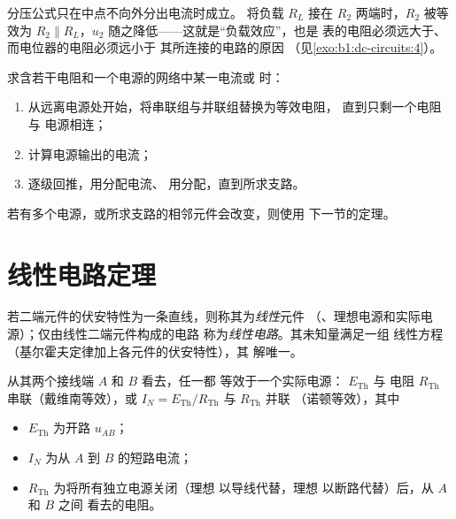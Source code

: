 \begin{remark}[分压器的负载]\label{rem:b1:dc-circuits:loading}
分压公式只在中点不向外分出电流时成立。
将负载 $R_L$ 接在 $R_2$ 两端时，$R_2$ 被等效为 $R_2
\parallel R_L$，$u_2$ 随之降低——这就是“负载效应”，也是
表的电阻必须远大于、而电位器的电阻必须远小于
其所连接的电路的原因
（见\cref{exo:b1:dc-circuits:4}）。
\end{remark}

\begin{method}[化简网络]\label{met:b1:dc-circuits:reduce}
求含若干电阻和一个电源的网络中某一电流或
时：
\begin{enumerate}
  \item 从远离电源处开始，将串联组与并联组替换为等效电阻，
        直到只剩一个电阻与
        电源相连；
  \item 计算电源输出的电流；
  \item 逐级回推，用分配电流、
        用分配，直到所求支路。
\end{enumerate}
若有多个电源，或所求支路的相邻元件会改变，则使用
下一节的定理。
\end{method}

\section{线性电路定理}

\begin{definition}\label{def:b1:dc-circuits:linear}
若二端元件的伏安特性为一条直线，则称其为\emph{线性}元件
（、理想电源和实际电源）；仅由线性二端元件构成的电路
称为\emph{线性电路}。其未知量满足一组
线性方程（基尔霍夫定律加上各元件的伏安特性），其
解唯一。
\end{definition}

\begin{theorem}[戴维南定理与诺顿定理]\label{thm:b1:dc-circuits:thevenin}
从其两个接线端 $A$ 和 $B$ 看去，任一都
等效于一个实际电源： $E_{\mathrm{Th}}$ 与
电阻 $R_{\mathrm{Th}}$ 串联（戴维南等效），或 $I_N =
E_{\mathrm{Th}}/R_{\mathrm{Th}}$ 与 $R_{\mathrm{Th}}$ 并联
（诺顿等效），其中
\begin{itemize}
  \item $E_{\mathrm{Th}}$ 为开路 $u_{AB}$；
  \item $I_N$ 为从 $A$ 到 $B$ 的短路电流；
  \item $R_{\mathrm{Th}}$ 为将所有独立电源关闭（理想
        以导线代替，理想
        以断路代替）后，从 $A$ 和 $B$ 之间
        看去的电阻。
\end{itemize}
\end{theorem}


